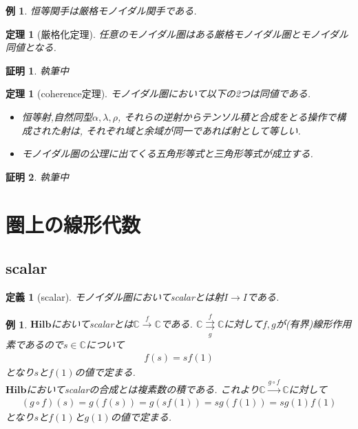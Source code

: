 \documentclass[a4paper,12pt]{ltjsarticle}
\theoremstyle{break}
\newtheorem{defn}[thm]{定義}
\newtheorem{eg}[thm]{例}
\newtheorem{thrm}[thm]{定理}
\newtheorem*{prf}{証明}
\newcommand{\hilb}{\mathbf{Hilb}}
\newcommand{\mbc}{\mathbb{C}}
\newcommand{\xr}[1]{\xrightarrow{#1}}
\newcommand{\ci}{\circ}
\newcommand{\al}{\alpha}
\newcommand{\la}{\lambda}
\numberwithin{equation}{section}
\begin{document}
\begin{eg}
  恒等関手は厳格モノイダル関手である. 
\end{eg}

\begin{thrm}[厳格化定理]
  任意のモノイダル圏はある厳格モノイダル圏とモノイダル同値となる.  
\end{thrm} 

\begin{prf}
  執筆中
\end{prf}

\begin{thrm}[coherence定理]
  モノイダル圏において以下の2つは同値である. 
  \begin{itemize}
    \item 恒等射,自然同型$\al,\la,\rho$, それらの逆射からテンソル積と合成をとる操作で構成された射は, それぞれ域と余域が同一であれば射として等しい. 
    \item モノイダル圏の公理に出てくる五角形等式と三角形等式が成立する. 
  \end{itemize}
\end{thrm}

\begin{prf}
  執筆中
\end{prf}

\newpage

\section{圏上の線形代数}

\subsection{scalar}

\begin{defn}[scalar]
  モノイダル圏においてscalarとは射$I \to I$である. 
\end{defn}

\begin{eg}
  $\hilb$においてscalarとは$\mbc \xr{f} \mbc$である. 
  $\mbc \overset{f}{\underset{g}{\rightrightarrows}} \mbc$に対して$f,g$が(有界)線形作用素であるので$s \in \mbc$について
  \begin{align*}
    f(s)=sf(1)
  \end{align*}
  となり$s$と$f(1)$の値で定まる. \\
  $\hilb$においてscalarの合成とは複素数の積である. 
  これより$\mbc \xr{g \ci f} \mbc$に対して
  \begin{align*}
    (g \ci f)(s) = g(f(s)) = g(sf(1)) = sg(f(1)) = sg(1)f(1)
  \end{align*}
  となり$s$と$f(1)$と$g(1)$の値で定まる. 
\end{eg}
\end{document}
